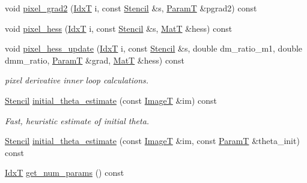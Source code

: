 \begin{DoxyCompactItemize}
void \hyperlink{classmappel_1_1Gauss1DModel_aeb6090ca6812629d8b719ed9a45cf7f3}{pixel\+\_\+grad2} (\hyperlink{namespacemappel_ab17ec0f30b61ece292439d7ece81d3a8}{IdxT} i, const \hyperlink{classmappel_1_1Gauss1DModel_1_1Stencil}{Stencil} \&s, \hyperlink{classmappel_1_1PointEmitterModel_a665ec6aea3aac139bb69a23c06d4b9a1}{ParamT} \&pgrad2) const 
\item 
void \hyperlink{classmappel_1_1Gauss1DModel_a407773f7ffe464018fbaa18e8c8fe22a}{pixel\+\_\+hess} (\hyperlink{namespacemappel_ab17ec0f30b61ece292439d7ece81d3a8}{IdxT} i, const \hyperlink{classmappel_1_1Gauss1DModel_1_1Stencil}{Stencil} \&s, \hyperlink{namespacemappel_a7091ab87c528041f7e2027195fad8915}{MatT} \&hess) const 
\item 
void \hyperlink{classmappel_1_1Gauss1DModel_a6b0a57e7620ef80030c94903aae5954f}{pixel\+\_\+hess\+\_\+update} (\hyperlink{namespacemappel_ab17ec0f30b61ece292439d7ece81d3a8}{IdxT} i, const \hyperlink{classmappel_1_1Gauss1DModel_1_1Stencil}{Stencil} \&s, double dm\+\_\+ratio\+\_\+m1, double dmm\+\_\+ratio, \hyperlink{classmappel_1_1PointEmitterModel_a665ec6aea3aac139bb69a23c06d4b9a1}{ParamT} \&grad, \hyperlink{namespacemappel_a7091ab87c528041f7e2027195fad8915}{MatT} \&hess) const 
\begin{DoxyCompactList}\small\item\em pixel derivative inner loop calculations. \end{DoxyCompactList}\item 
\hyperlink{classmappel_1_1Gauss1DModel_1_1Stencil}{Stencil} \hyperlink{classmappel_1_1Gauss1DModel_a055a3bd9bc0ff8540a48a1c6f50ec523}{initial\+\_\+theta\+\_\+estimate} (const \hyperlink{classmappel_1_1ImageFormat1DBase_a521a1ff391a52a636fac4aac7c7ba02c}{ImageT} \&im) const 
\begin{DoxyCompactList}\small\item\em Fast, heuristic estimate of initial theta. \end{DoxyCompactList}\item 
\hyperlink{classmappel_1_1Gauss1DModel_1_1Stencil}{Stencil} \hyperlink{classmappel_1_1Gauss1DModel_a4c4e01a489a6d8f7b119dd50b51610c2}{initial\+\_\+theta\+\_\+estimate} (const \hyperlink{classmappel_1_1ImageFormat1DBase_a521a1ff391a52a636fac4aac7c7ba02c}{ImageT} \&im, const \hyperlink{classmappel_1_1PointEmitterModel_a665ec6aea3aac139bb69a23c06d4b9a1}{ParamT} \&theta\+\_\+init) const 
\item 
\hyperlink{namespacemappel_ab17ec0f30b61ece292439d7ece81d3a8}{IdxT} \hyperlink{classmappel_1_1PointEmitterModel_a6fe8129bd24ab5c6620b3ab106b6c91a}{get\+\_\+num\+\_\+params} () const 

\end{DoxyCompactItemize}
